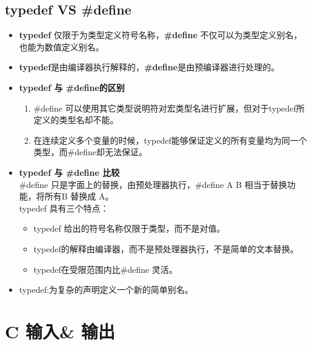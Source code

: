 \documentclass[UTF8]{ctexart}
\begin{document}
			\subsection{typedef VS \#define}
			\begin{itemize}
				\item \textbf{typedef} 仅限于为类型定义符号名称，\textbf{\#define} 不仅可以为类型定义别名，也能为数值定义别名。
				\item \textbf{typedef}是由编译器执行解释的，\textbf{\#define}是由预编译器进行处理的。
			\end{itemize}
			\begin{framed}
				\begin{itemize}
					\item \textbf{typedef 与 \#define的区别}\begin{enumerate}
						\item \#define 可以使用其它类型说明符对宏类型名进行扩展，但对于typedef所定义的类型名却不能。
						\item 在连续定义多个变量的时候，typedef能够保证定义的所有变量均为同一个类型，而\#define却无法保证。
					\end{enumerate}
					\item \textbf{typedef 与 \#define 比较}\\ \#define 只是字面上的替换，由预处理器执行，\#define A B 相当于替换功能，将所有B 替换成 A。\\typedef 具有三个特点：\begin{itemize}
						\item typedef 给出的符号名称仅限于类型，而不是对值。
						\item typedef的解释由编译器，而不是预处理器执行，不是简单的文本替换。
						\item typedef在受限范围内比\#define 灵活。 
					\end{itemize}
					\item typedef:为复杂的声明定义一个新的简单别名。
				\end{itemize}
			\end{framed}

			\clearpage
			\section{C 输入\& 输出}
\end{document}
